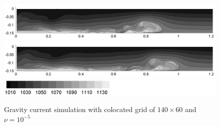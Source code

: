 \begin{figure}[htbp]
\begin{center}
\includegraphics[scale=0.55]{../figures/colocated/Fig9case/140-60-03-VE-5/07.png}    \includegraphics[scale=0.55]{../figures/colocated/Fig9case/140-60-03-VE-5/08.png}
\includegraphics[scale=0.55]{../figures/colocated/Fig9case/label.png}
    \caption{Gravity current simulation with colocated grid of $140 \times 60$ and $\nu=10^{-5}$}
    \label{fig:140-60-03-VE-5}
  \end{center}
\end{figure}


